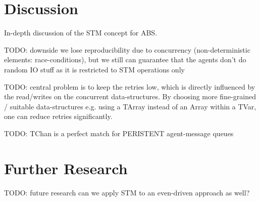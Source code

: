 \section{Discussion}
\label{sect:stm_discussion}
In-depth discussion of the STM concept for ABS.

TODO: downside we lose reproducibility due to concurrency (non-deterministic elements: race-conditions), but we still can guarantee that the agents don't do random IO stuff as it is restricted to STM operations only

TODO: central problem is to keep the retries low, which is directly influenced by the read/writes on the concurrent data-structures. By choosing more fine-grained / suitable data-structures e.g. using a TArray instead of an Array within a TVar, one can reduce retries significantly.

TODO: TChan is a perfect match for PERISTENT agent-message queues

\section{Further Research}
\label{sect:stm_further}
TODO: future research can we apply STM to an even-driven approach as well?
